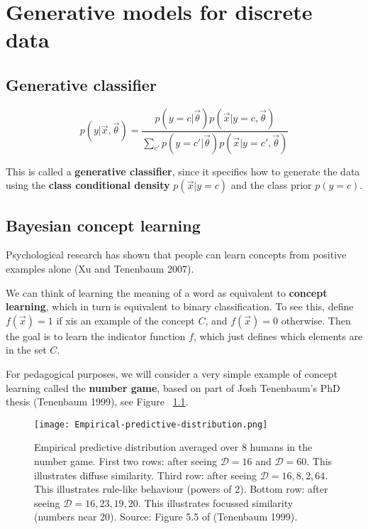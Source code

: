 \chapter{Generative models for discrete data}

\section{Generative classifier}
\begin{equation}\label{eqn:Generative-classifier}
p(y|\vec{x},\vec{\theta})=\dfrac{p(y=c|\vec{\theta})p(\vec{x}|y=c,\vec{\theta})}{\sum_{c'}{p(y=c'|\vec{\theta})p(\vec{x}|y=c',\vec{\theta})}}
\end{equation}

This is called a \textbf{generative classifier}, since it specifies how to generate the data using the \textbf{class conditional density} $p(\vec{x}|y=c)$ and the class prior $p(y=c)$. 


\section{Bayesian concept learning}
Psychological research has shown that people can learn concepts from positive examples alone (Xu and Tenenbaum 2007).

We can think of learning the meaning of a word as equivalent to \textbf{concept learning}, which in turn is equivalent to binary classification. To see this, define $f(\vec{x})=1$ if xis an example of the concept $C$, and $f(\vec{x})=0$ otherwise. Then the goal is to learn the indicator function $f$, which just defines which elements are in the set $C$.

For pedagogical purposes, we will consider a very simple example of concept learning called the \textbf{number game}, based on part of Josh Tenenbaum’s PhD thesis (Tenenbaum 1999), see Figure ~\ref{fig:Empirical-predictive-distribution}. 

\begin{figure}[hbtp]
\centering
    \texttt{[image: Empirical-predictive-distribution.png]}
\caption{Empirical predictive distribution averaged over 8 humans in the number game. First two rows: after seeing $\mathcal{D}={16}$ and $\mathcal{D}={60}$. This illustrates diffuse similarity. Third row: after seeing $\mathcal{D}={16,8,2,64}$. This illustrates rule-like behaviour (powers of 2). Bottom row: after seeing $\mathcal{D}={16,23,19,20}$. This illustrates focussed similarity (numbers near 20). Source: Figure 5.5 of (Tenenbaum 1999).}
\label{fig:Empirical-predictive-distribution} 
\end{figure}


